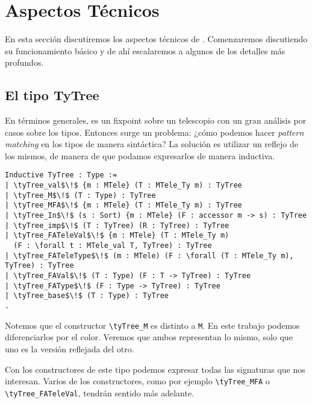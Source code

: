 \chapter{Aspectos Técnicos}\label{ch:technical}

En esta sección discutiremos los aspectos técnicos de \lift.
Comenzaremos discutiendo su funcionamiento básico y de ahí escalaremos a algunos de los detalles más profundos. 

\section{El tipo TyTree}

En términos generales, \lift es un fixpoint sobre un telescopio con un gran análisis por casos sobre los tipos.
Entonces surge un problema: ¿cómo podemos hacer \textit{pattern matching} en los tipos de manera sintáctica?
La solución es utilizar un reflejo de los mismos, de manera de que podamos expresarlos de manera inductiva.

\begin{lstlisting}[float=h,frame=tb,caption={El tipo inductivo \lstinline{TyTree}},label=lst:tytree]
Inductive TyTree : Type :=
| \tyTree_val$\!$ {m : MTele} (T : MTele_Ty m) : TyTree
| \tyTree_M$\!$ (T : Type) : TyTree
| \tyTree_MFA$\!$ {m : MTele} (T : MTele_Ty m) : TyTree
| \tyTree_In$\!$ (s : Sort) {m : MTele} (F : accessor m -> s) : TyTree
| \tyTree_imp$\!$ (T : TyTree) (R : TyTree) : TyTree
| \tyTree_FATeleVal$\!$ {m : MTele} (T : MTele_Ty m)
  (F : \forall t : MTele_val T, TyTree) : TyTree
| \tyTree_FATeleType$\!$ (m : MTele) (F : \forall (T : MTele_Ty m), TyTree) : TyTree
| \tyTree_FAVal$\!$ (T : Type) (F : T -> TyTree) : TyTree
| \tyTree_FAType$\!$ (F : Type -> TyTree) : TyTree
| \tyTree_base$\!$ (T : Type) : TyTree
.
\end{lstlisting}

Notemos que el constructor \lstinline{\tyTree_M} es distinto a \lstinline{M}. En este trabajo podemos diferenciarlos por el color. Veremos que ambos representan lo mismo, solo que uno es la versión reflejada del otro.

Con los constructores de este tipo podemos expresar todas las signaturas que nos interesan. Varios de los constructores, como por ejemplo \lstinline{\tyTree_MFA} o \lstinline{\tyTree_FATeleVal}, tendrán sentido más adelante.

